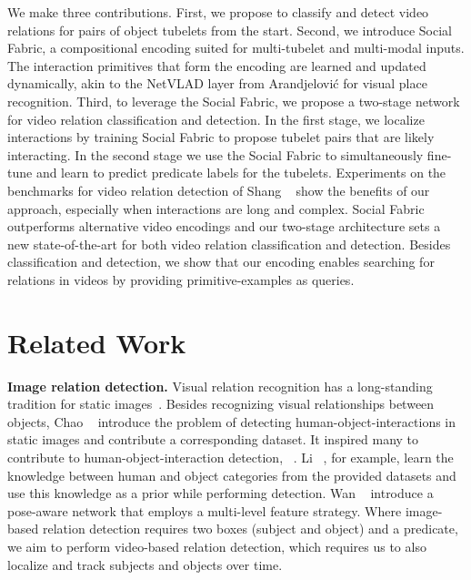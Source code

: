 \documentclass[10pt,twocolumn,letterpaper]{article}
\begin{document}
We make three contributions. First, we propose to classify and detect video relations for pairs of object tubelets from the start. Second, we introduce Social Fabric, a compositional encoding suited for multi-tubelet and multi-modal inputs. The interaction primitives that form the encoding are learned and updated dynamically, akin to the NetVLAD layer from Arandjelovi\'c \etal \cite{arandjelovic2016netvlad} for visual place recognition. Third, to leverage the Social Fabric, we propose a two-stage network for video relation classification and detection. In the first stage, we localize interactions by training Social Fabric to propose tubelet pairs that are likely interacting. In the second stage we use the Social Fabric to simultaneously fine-tune and learn to predict predicate labels for the tubelets.
Experiments on the benchmarks for video relation detection of Shang \etal~\cite{shang2017video,shang2019annotating} show the benefits of our approach, especially when interactions are long and complex. Social Fabric outperforms alternative video encodings and our two-stage architecture sets a new state-of-the-art for both video relation classification and detection.
Besides classification and detection, we show that our encoding enables searching for relations in videos by providing primitive-examples as queries.

\section{Related Work}
\textbf{Image relation detection.}
Visual relation recognition has a long-standing tradition for static images~\cite{gupta2009observing, yao2010modeling, chao2015hico, li2019transferable, liao2020ppdm, wan2019pose,Hu_2020_CVPR,Graber_2020_CVPR,Mi_2020_CVPR,Inayoshi_eccv_2020}. Besides recognizing visual relationships between objects, Chao \etal~\cite{chao2018learning} introduce the problem of detecting human-object-interactions in static images and contribute a corresponding dataset. It inspired many to contribute to human-object-interaction detection, \eg~\cite{li2019transferable,wan2019pose,wang2020learning, xu2019learning,Cui_2020_CVPR}. Li \etal~\cite{li2019transferable}, for example, learn the knowledge between human and object categories from the provided datasets and use this knowledge as a prior while performing detection. Wan \etal~\cite{wan2019pose} introduce a pose-aware network that employs a multi-level feature strategy. Where image-based relation detection requires two boxes (subject and object) and a predicate, we aim to perform video-based relation detection, which requires us to also localize and track subjects and objects over time.
\end{document}
